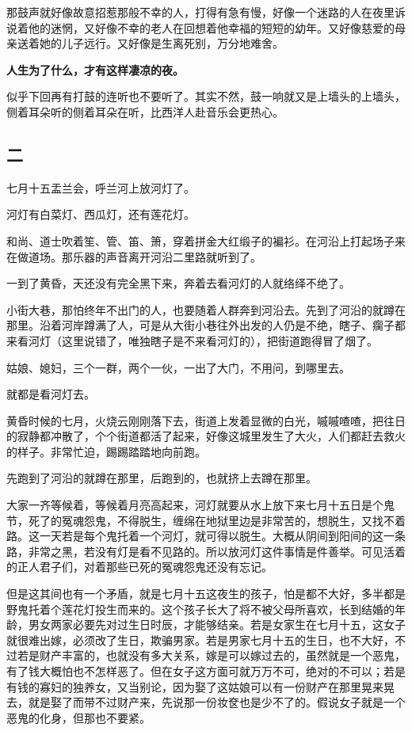 \documentclass[UTF8]{ctexart}
\begin{document}
那鼓声就好像故意招惹那般不幸的人，打得有急有慢，好像一个迷路的人在夜里诉说着他的迷惘，又好像不幸的老人在回想着他幸福的短短的幼年。又好像慈爱的母亲送着她的儿子远行。又好像是生离死别，万分地难舍。

\textbf{人生为了什么，才有这样凄凉的夜。}

似乎下回再有打鼓的连听也不要听了。其实不然，鼓一响就又是上墙头的上墙头，侧着耳朵听的侧着耳朵在听，比西洋人赴音乐会更热心。

\subsection{二}

七月十五盂兰会，呼兰河上放河灯了。

河灯有白菜灯、西瓜灯，还有莲花灯。

和尚、道士吹着笙、管、笛、箫，穿着拼金大红缎子的褊衫。在河沿上打起场子来在做道场。那乐器的声音离开河沿二里路就听到了。

一到了黄昏，天还没有完全黑下来，奔着去看河灯的人就络绎不绝了。

小街大巷，那怕终年不出门的人，也要随着人群奔到河沿去。先到了河沿的就蹲在那里。沿着河岸蹲满了人，可是从大街小巷往外出发的人仍是不绝，瞎子、瘸子都来看河灯（这里说错了，唯独瞎子是不来看河灯的），把街道跑得冒了烟了。

姑娘、媳妇，三个一群，两个一伙，一出了大门，不用问，到哪里去。

就都是看河灯去。

黄昏时候的七月，火烧云刚刚落下去，街道上发着显微的白光，嘁嘁喳喳，把往日的寂静都冲散了，个个街道都活了起来，好像这城里发生了大火，人们都赶去救火的样子。非常忙迫，踢踢踏踏地向前跑。

先跑到了河沿的就蹲在那里，后跑到的，也就挤上去蹲在那里。

大家一齐等候着，等候着月亮高起来，河灯就要从水上放下来七月十五日是个鬼节，死了的冤魂怨鬼，不得脱生，缠绵在地狱里边是非常苦的，想脱生，又找不着路。这一天若是每个鬼托着一个河灯，就可得以脱生。大概从阴间到阳间的这一条路，非常之黑，若没有灯是看不见路的。所以放河灯这件事情是件善举。可见活着的正人君子们，对着那些已死的冤魂怨鬼还没有忘记。

但是这其间也有一个矛盾，就是七月十五这夜生的孩子，怕是都不大好，多半都是野鬼托着个莲花灯投生而来的。这个孩子长大了将不被父母所喜欢，长到结婚的年龄，男女两家必要先对过生日时辰，才能够结亲。若是女家生在七月十五，这女子就很难出嫁，必须改了生日，欺骗男家。若是男家七月十五的生日，也不大好，不过若是财产丰富的，也就没有多大关系，嫁是可以嫁过去的，虽然就是一个恶鬼，有了钱大概怕也不怎样恶了。但在女子这方面可就万万不可，绝对的不可以；若是有钱的寡妇的独养女，又当别论，因为娶了这姑娘可以有一份财产在那里晃来晃去，就是娶了而带不过财产来，先说那一份妆奁也是少不了的。假说女子就是一个恶鬼的化身，但那也不要紧。
\end{document}

